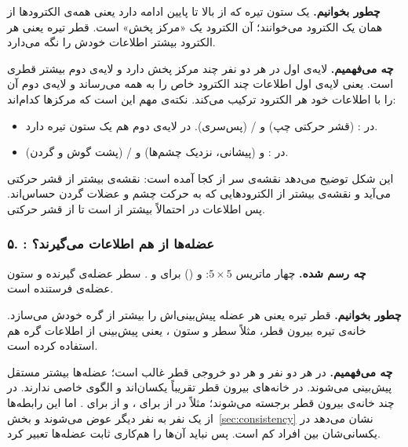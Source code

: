 \textbf{چطور بخوانیم.} یک ستون تیره که از بالا تا پایین ادامه دارد یعنی همه‌ی الکترودها از همان یک الکترود می‌خوانند؛ آن الکترود یک «مرکز پخش» است. قطر تیره یعنی هر الکترود بیشتر اطلاعات خودش را نگه می‌دارد.

\textbf{چه می‌فهمیم.} لایه‌ی اول در هر دو نفر چند مرکز پخش دارد و لایه‌ی دوم بیشتر قطری است. یعنی لایه‌ی اول اطلاعات چند الکترود خاص را به همه می‌رساند و لایه‌ی دوم آن را با اطلاعات خود هر الکترود ترکیب می‌کند. نکته‌ی مهم این است که مرکزها کدام‌اند:
\begin{itemize}
\item در :  (قشر حرکتی چپ) و / (پس‌سری).  در لایه‌ی دوم هم یک ستون تیره دارد.
\item در :  و  (پیشانی، نزدیک چشم‌ها) و / (پشت گوش و گردن).
\end{itemize}
این شکل توضیح می‌دهد نقشه‌ی سر از کجا آمده است: نقشه‌ی  بیشتر از قشر حرکتی می‌آید و نقشه‌ی  بیشتر از الکترودهایی که به حرکت چشم و عضلات گردن حساس‌اند. پس اطلاعات  در  احتمالاً بیشتر از  است تا از قشر حرکتی.


\subsubsection*{۵. : عضله‌ها از هم اطلاعات می‌گیرند؟}

\textbf{چه رسم شده.} چهار ماتریس $5\times5$:  و  () برای  و . سطر عضله‌ی گیرنده و ستون عضله‌ی فرستنده است.

\textbf{چطور بخوانیم.} قطر تیره یعنی هر عضله پیش‌بینی‌اش را بیشتر از گره خودش می‌سازد. خانه‌ی تیره بیرون قطر، مثلاً سطر  و ستون ، یعنی پیش‌بینی  از اطلاعات گره  هم استفاده کرده است.

\textbf{چه می‌فهمیم.} در هر دو نفر و هر دو خروجی قطر غالب است؛ عضله‌ها بیشتر مستقل پیش‌بینی می‌شوند. در  خانه‌های بیرون قطر تقریباً یکسان‌اند و الگوی خاصی ندارند. در  چند خانه‌ی بیرون قطر برجسته می‌شوند؛ مثلاً در   از  برای ، و  از  برای . اما این رابطه‌ها از یک نفر به نفر دیگر عوض می‌شوند و بخش~\ref{sec:consistency} نشان می‌دهد در  یکسانی‌شان بین افراد کم است. پس نباید آن‌ها را هم‌کاری ثابت عضله‌ها تعبیر کرد.

